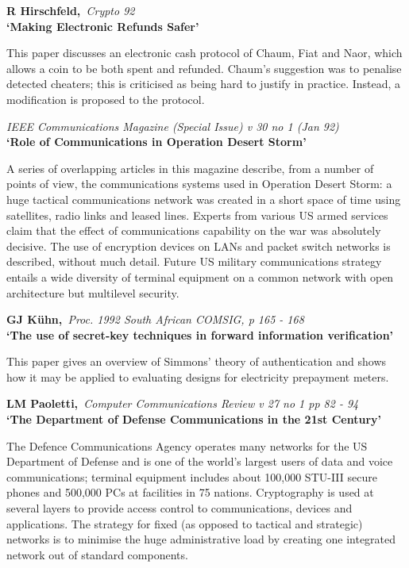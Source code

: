 \pagebreak

{\bf \noindent R Hirschfeld,}{\em ~Crypto 92\\}
{\bf `Making Electronic Refunds Safer'}

This paper discusses an electronic cash protocol of Chaum, Fiat and
Naor, which allows a coin to be both spent and refunded. Chaum's
suggestion was to penalise detected cheaters; this is criticised as
being hard to justify in practice. Instead, a modification is proposed
to the protocol.

{\em \noindent IEEE Communications Magazine (Special Issue) v 30 no 1 (Jan 
92)\\}
{\bf `Role of Communications in Operation Desert Storm'}

A series of overlapping articles in this magazine describe, from a number of 
points of view, the communications systems used in Operation Desert Storm: a
huge tactical communications network was created in a short space of time 
using satellites, radio links and leased lines. Experts from various US armed 
services claim that the effect of communications capability on the war was 
absolutely decisive. The use of encryption devices on LANs and packet switch 
networks is described, without much detail. Future US military communications 
strategy entails a wide diversity of terminal equipment on a common network 
with open architecture but multilevel security.

{\bf \noindent GJ K\"{u}hn,}{\em ~Proc. 1992 South African COMSIG, p 165 - 
168\\}
{\bf `The use of secret-key techniques in forward information verification'}

This paper gives an overview of Simmons' theory of authentication and
shows how it may be applied to evaluating designs for electricity prepayment
meters.

{\bf \noindent LM Paoletti,}{\em ~Computer Communications Review v 27 no 1 
pp 82 - 94\\}
{\bf `The Department of Defense Communications in the 21st Century'}

The Defence Communications Agency operates many networks for the US
Department of Defense and is one of the world's largest users of data
and voice communications; terminal equipment includes about 100,000 STU-III
secure phones and 500,000 PCs at facilities in 75 nations. Cryptography is 
used at several layers to provide access control to communications, devices 
and applications. The strategy for fixed (as opposed to tactical and 
strategic) networks is to minimise the huge administrative load by creating 
one integrated network out of standard components.

